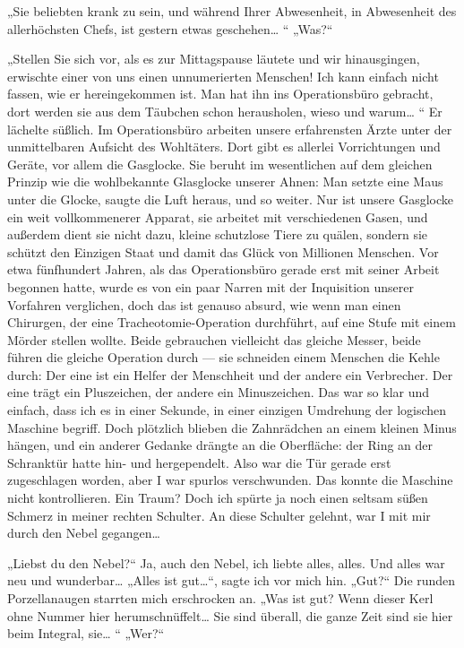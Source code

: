 „Sie beliebten krank zu sein, und während Ihrer Abwesenheit, in
Abwesenheit des allerhöchsten Chefs, ist gestern etwas geschehen\ldots{}
“ „Was?“

„Stellen Sie sich vor, als es zur Mittagspause läutete und wir
hinausgingen, erwischte einer von uns einen unnumerierten Menschen!
Ich kann einfach nicht fassen, wie er hereingekommen ist. Man hat
ihn ins Operationsbüro gebracht, dort werden sie aus dem Täubchen
schon herausholen, wieso und warum\ldots{} “ Er lächelte süßlich. Im
Operationsbüro arbeiten unsere erfahrensten Ärzte unter der
unmittelbaren Aufsicht des Wohltäters. Dort gibt es allerlei
Vorrichtungen und Geräte, vor allem die Gasglocke. Sie beruht im
wesentlichen auf dem gleichen Prinzip wie die wohlbekannte
Glasglocke unserer Ahnen: Man setzte eine Maus unter die Glocke,
saugte die Luft heraus, und so weiter. Nur ist unsere Gasglocke ein
weit vollkommenerer Apparat, sie arbeitet mit verschiedenen Gasen,
und außerdem dient sie nicht dazu, kleine schutzlose Tiere zu
quälen, sondern sie schützt den Einzigen Staat und damit das Glück
von Millionen Menschen. Vor etwa fünfhundert Jahren, als das
Operationsbüro gerade erst mit seiner Arbeit begonnen hatte, wurde
es von ein paar Narren mit der Inquisition unserer Vorfahren
verglichen, doch das ist genauso absurd, wie wenn man einen
Chirurgen, der eine Tracheotomie-Operation durchführt, auf eine
Stufe mit einem Mörder stellen wollte. Beide gebrauchen vielleicht
das gleiche Messer, beide führen die gleiche Operation durch — sie
schneiden einem Menschen die Kehle durch: Der eine ist ein Helfer
der Menschheit
und der andere ein Verbrecher. Der eine trägt ein Pluszeichen, der
andere ein Minuszeichen. Das war so klar und einfach, dass ich es
in einer Sekunde, in einer einzigen Umdrehung der logischen
Maschine begriff. Doch plötzlich blieben die Zahnrädchen an einem
kleinen Minus hängen, und ein anderer Gedanke drängte an die
Oberfläche: der Ring an der Schranktür hatte hin- und hergependelt.
Also war die Tür gerade erst zugeschlagen worden, aber I war
spurlos verschwunden. Das konnte die Maschine nicht kontrollieren.
Ein Traum? Doch ich spürte ja noch einen seltsam süßen Schmerz in
meiner rechten Schulter. An diese Schulter gelehnt, war I mit mir
durch den Nebel gegangen\ldots{}

„Liebst du den Nebel?“ Ja, auch den Nebel, ich liebte alles, alles.
Und alles war neu und wunderbar\ldots{} „Alles ist gut\ldots{}“, sagte ich
vor mich hin. „Gut?“ Die runden Porzellanaugen starrten mich
erschrocken an. „Was ist gut? Wenn dieser Kerl ohne Nummer hier
herumschnüffelt\ldots{} Sie sind überall, die ganze Zeit sind sie hier
beim Integral, sie\ldots{} “ „Wer?“


